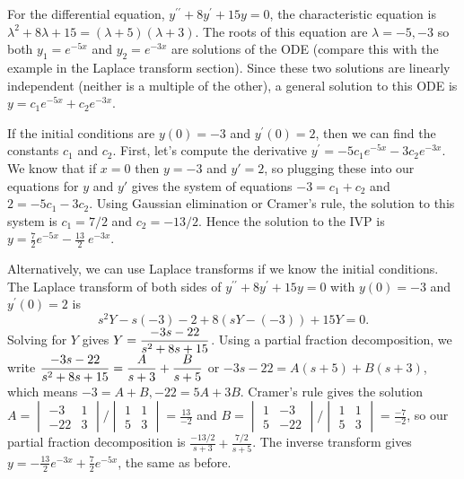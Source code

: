 \begin{example}
For the differential equation, $y^{\prime\prime}+8y^\prime+15y=0$, the characteristic equation is $\lambda^2+8\lambda+15 = (\lambda+5)(\lambda +3)$.  The roots of this equation are $\lambda=-5,-3$ so both $y_1=e^{-5x}$ and $y_2=e^{-3x}$ are solutions of the ODE (compare this with the example in the Laplace transform section). Since these two solutions are linearly independent (neither is a multiple of the other), a general solution to this ODE is $y=c_1e^{-5x}+c_2e^{-3x}$. 

If the initial conditions are $y(0)=-3$ and $y^\prime(0)=2$, then we can find the constants $c_1$ and $c_2$.  First, let's compute the derivative $y^\prime = -5c_1e^{-5x}-3c_2e^{-3x}$.  We know that if $x=0$ then $y=-3$ and $y'=2$, so plugging these into our equations for $y$ and $y'$ gives the system of equations $-3=c_1+c_2$ and $2=-5c_1-3c_2$. Using Gaussian elimination or Cramer's rule, the solution to this system is $c_1=7/2$ and $c_2=-13/2$. Hence the solution to the IVP is $y=\frac72  e^{-5x}-\frac{13}{2}\ e^{-3x}$. 

Alternatively, we can use Laplace transforms if we know the initial conditions.  
The Laplace transform of both sides of $y^{\prime\prime}+8y^\prime+15y=0$ with $y(0)=-3$ and $y^\prime(0)=2$ is $$s^2Y-s(-3)-2+8(sY-(-3))+15Y=0.$$  Solving for $Y$ gives $\displaystyle Y=\dfrac{-3s -22}{s^2+8s+15}$. Using a partial fraction decomposition, we write  $\displaystyle \frac{-3s -22}{s^2+8s+15} = \frac{A}{s+3}+\frac{B}{s+5}$ or $-3s-22=A(s+5)+B(s+3)$, which means $-3=A+B, -22=5A+3B$.  Cramer's rule gives the solution $A=\begin{vmatrix}-3&1\\ -22&3 \end{vmatrix}/\begin{vmatrix}1&1\\5&3\end{vmatrix} = \frac{13}{-2}$ and  $B=\begin{vmatrix}1&-3\\ 5&-22 \end{vmatrix}/\begin{vmatrix}1&1\\5&3\end{vmatrix} = \frac{-7}{-2}$, so our partial fraction decomposition is $\frac{-13/2}{s+3}+\frac{7/2}{s+5}$. The inverse transform gives $y=-\frac{13}{2} e^{-3x} +\frac{7}{2}e^{-5x}$, the same as before.
\end{example}

